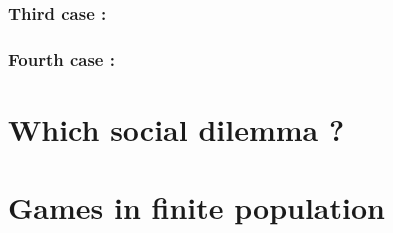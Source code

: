 \documentclass{article}
\begin{document}
\subsubsection{Third case : }

\subsubsection{Fourth case : }


\section{Which social dilemma ?}


\section{Games in finite population}
\end{document}
